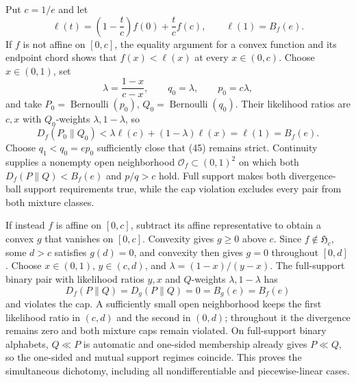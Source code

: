 Put \(c=1/e\) and let
\[
 \ell(t)=\left(1-\frac tc\right)f(0)+\frac tc f(c),
 \qquad \ell(1)=B_f(e).
\]
If \(f\) is not affine on \([0,c]\), the equality argument for a convex function and its endpoint chord shows that \(f(x)<\ell(x)\) at every \(x\in(0,c)\).  Choose \(x\in(0,1)\), set
\[
 \lambda=\frac{1-x}{c-x},\qquad q_0=\lambda,\qquad p_0=c\lambda,
\]
and take \(P_0=\operatorname{Bernoulli}(p_0)\), \(Q_0=\operatorname{Bernoulli}(q_0)\).  Their likelihood ratios are \(c,x\) with \(Q_0\)-weights \(\lambda,1-\lambda\), so
\[
 D_f(P_0\|Q_0)
 <\lambda\ell(c)+(1-\lambda)\ell(x)
 =\ell(1)=B_f(e). \tag{45}
\]
Choose \(q_1<q_0=ep_0\) sufficiently close that (45) remains strict.  Continuity supplies a nonempty open neighborhood \(\mathcal O_f\subset(0,1)^2\) on which both \(D_f(P\|Q)<B_f(e)\) and \(p/q>c\) hold.  Full support makes both divergence-ball support requirements true, while the cap violation excludes every pair from both mixture classes.

If instead \(f\) is affine on \([0,c]\), subtract its affine representative to obtain a convex \(g\) that vanishes on \([0,c]\).  Convexity gives \(g\ge0\) above \(c\).  Since \(f\notin\mathfrak H_c\), some \(d>c\) satisfies \(g(d)=0\), and convexity then gives \(g=0\) throughout \([0,d]\).  Choose \(x\in(0,1)\), \(y\in(c,d)\), and \(\lambda=(1-x)/(y-x)\).  The full-support binary pair with likelihood ratios \(y,x\) and \(Q\)-weights \(\lambda,1-\lambda\) has
\[
 D_f(P\|Q)=D_g(P\|Q)=0=B_g(e)=B_f(e)
\]
and violates the cap.  A sufficiently small open neighborhood keeps the first likelihood ratio in \((c,d)\) and the second in \((0,d)\); throughout it the divergence remains zero and both mixture caps remain violated.  On full-support binary alphabets, \(Q\ll P\) is automatic and one-sided membership already gives \(P\ll Q\), so the one-sided and mutual support regimes coincide.  This proves the simultaneous dichotomy, including all nondifferentiable and piecewise-linear cases.